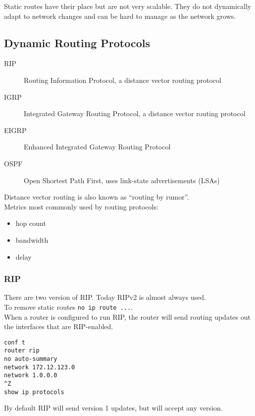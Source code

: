 Static routes have their place but are not very scalable. They do not
dynamically adapt to network changes and can be hard to manage as the network
grows.

\subsection{Dynamic Routing Protocols}

\begin{description}
\item[RIP]
Routing Information Protocol, a distance vector routing protocol
\item[IGRP]
Integrated Gateway Routing Protocol, a distance vector routing protocol
\item[EIGRP]
Enhanced Integrated Gateway Routing Protocol
\item[OSPF]
Open Shortest Path First, uses link-state advertisements (LSAs)
\end{description}

Distance vector routing is also known as ``routing by rumor''.\\

Metrics most commonly used by routing protocols:

\begin{itemize}

\item hop count
\item bandwidth
\item delay

\end{itemize}

\subsubsection{RIP}

There are two version of RIP. Today RIPv2 is almost always used.\\

To remove static routes \texttt{no ip route ...}.\\

When a router is configured to run RIP, the router will send routing updates
out the interfaces that are RIP-enabled.

\begin{verbatim}
conf t
router rip
no auto-summary
network 172.12.123.0
network 1.0.0.0
^Z
show ip protocols
\end{verbatim}

By default RIP will send version 1 updates, but will accept any version.


